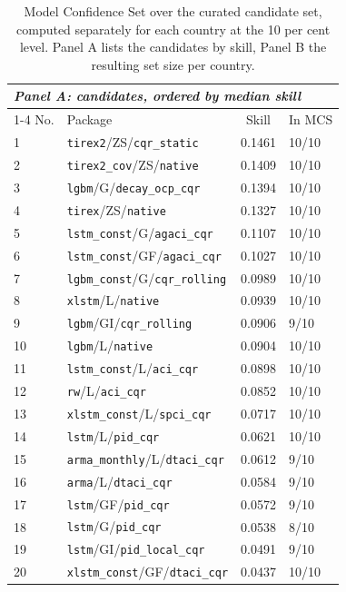 \begin{table}[t]
\centering
\caption{Model Confidence Set over the curated candidate set, computed separately
         for each country at the 10 per cent level. Panel A lists the candidates by
         skill, Panel B the resulting set size per country.}
\label{tab:res_mcs}
\small
\begin{tabular}{llcl}
\toprule
\multicolumn{4}{l}{\textit{Panel A: candidates, ordered by median skill}}\\
\cmidrule(lr){1-4}
No. & Package & Skill & In MCS \\
\midrule
1 & \texttt{tirex2}/ZS/\texttt{cqr\_static} & 0.1461 & 10/10 \\
2 & \texttt{tirex2\_cov}/ZS/\texttt{native} & 0.1409 & 10/10 \\
3 & \texttt{lgbm}/G/\texttt{decay\_ocp\_cqr} & 0.1394 & 10/10 \\
4 & \texttt{tirex}/ZS/\texttt{native} & 0.1327 & 10/10 \\
5 & \texttt{lstm\_const}/G/\texttt{agaci\_cqr} & 0.1107 & 10/10 \\
6 & \texttt{lstm\_const}/GF/\texttt{agaci\_cqr} & 0.1027 & 10/10 \\
7 & \texttt{lgbm\_const}/G/\texttt{cqr\_rolling} & 0.0989 & 10/10 \\
8 & \texttt{xlstm}/L/\texttt{native} & 0.0939 & 10/10 \\
9 & \texttt{lgbm}/GI/\texttt{cqr\_rolling} & 0.0906 & 9/10 \\
10 & \texttt{lgbm}/L/\texttt{native} & 0.0904 & 10/10 \\
11 & \texttt{lstm\_const}/L/\texttt{aci\_cqr} & 0.0898 & 10/10 \\
12 & \texttt{rw}/L/\texttt{aci\_cqr} & 0.0852 & 10/10 \\
13 & \texttt{xlstm\_const}/L/\texttt{spci\_cqr} & 0.0717 & 10/10 \\
14 & \texttt{lstm}/L/\texttt{pid\_cqr} & 0.0621 & 10/10 \\
15 & \texttt{arma\_monthly}/L/\texttt{dtaci\_cqr} & 0.0612 & 9/10 \\
16 & \texttt{arma}/L/\texttt{dtaci\_cqr} & 0.0584 & 9/10 \\
17 & \texttt{lstm}/GF/\texttt{pid\_cqr} & 0.0572 & 9/10 \\
18 & \texttt{lstm}/G/\texttt{pid\_cqr} & 0.0538 & 8/10 \\
19 & \texttt{lstm}/GI/\texttt{pid\_local\_cqr} & 0.0491 & 9/10 \\
20 & \texttt{xlstm\_const}/GF/\texttt{dtaci\_cqr} & 0.0437 & 10/10 \\

\end{tabular}
\end{table}
